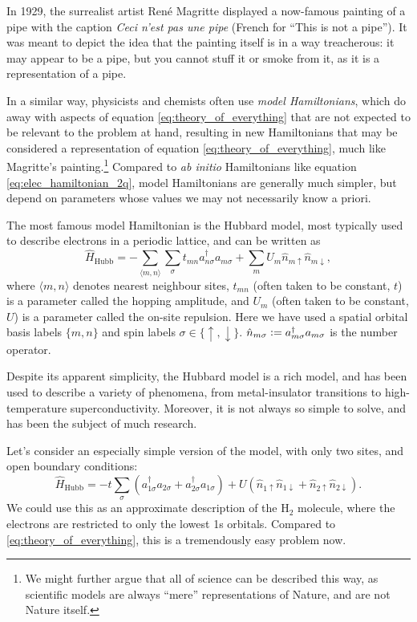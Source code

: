 In 1929, the surrealist artist Ren\'e Magritte displayed a now-famous painting of a pipe with the caption \emph{Ceci n'est pas une pipe} (French for ``This is not a pipe''). It was meant to depict the idea that the painting itself is in a way treacherous: it may appear to be a pipe, but you cannot stuff it or smoke from it, as it is a representation of a pipe.

In a similar way, physicists and chemists often use \emph{model Hamiltonians}, which do away with aspects of equation \eqref{eq:theory_of_everything} that are not expected to be relevant to the problem at hand, resulting in new Hamiltonians that may be considered a representation of equation \eqref{eq:theory_of_everything}, much like Magritte's painting.\footnote{We might further argue that all of science can be described this way, as scientific models are always ``mere'' representations of Nature, and are not Nature itself.} Compared to \emph{ab initio} Hamiltonians like equation \eqref{eq:elec_hamiltonian_2q}, model Hamiltonians are generally much simpler, but depend on parameters whose values we may not necessarily know a priori.

The most famous model Hamiltonian is the Hubbard model,\cite{Hubbard1963} most typically used to describe electrons in a periodic lattice, and can be written as
\begin{equation}
\label{eq:hubbard}
\hat H_\mathrm{Hubb} = - \sum_{\langle m,n\rangle}\sum_\sigma t_{mn} a_{n\sigma}^\dag a_{m\sigma} + \sum_m U_m\hat n_{m\uparrow}\hat n_{m\downarrow},
\end{equation}
where $\langle m,n\rangle$ denotes nearest neighbour sites, $t_{mn}$ (often taken to be constant, $t$) is a parameter called the hopping amplitude, and $U_m$ (often taken to be constant, $U$) is a parameter called the on-site repulsion. Here we have used a spatial orbital basis labels $\{m,n\}$ and spin labels $\sigma\in\{\uparrow,\downarrow\}$. $\hat n_{m\sigma}\mathrel{\mathop:}= a_{m\sigma}^\dag a_{m\sigma}$ is the number operator.

Despite its apparent simplicity, the Hubbard model is a rich model, and has been used to describe a variety of phenomena, from metal-insulator transitions to high-temperature superconductivity. Moreover, it is not always so simple to solve, and has been the subject of much research.\cite{Lieb1968a,liebermannFCIQMC2023}

Let's consider an especially simple version of the model, with only two sites, and open boundary conditions:
\begin{equation}
\label{eq:hubbard_h2}
\hat H_\mathrm{Hubb} = - t\sum_{\sigma}(a_{1\sigma}^\dag a_{2\sigma} + a_{2\sigma}^\dag a_{1\sigma}) + U(\hat n_{1\uparrow}\hat n_{1\downarrow}+\hat n_{2\uparrow}\hat n_{2\downarrow}).
\end{equation}
We could use this as an approximate description of the H$_2$ molecule, where the electrons are restricted to only the lowest 1s orbitals. Compared to \eqref{eq:theory_of_everything}, this is a tremendously easy problem now.

